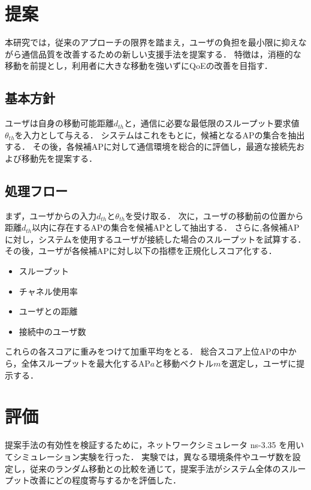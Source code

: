 \documentclass[dvipdfmx,twocolumn]{jsarticle}
\newcommand{\Note}[1]{\noindent \textbf{\textcolor{blue}{#1}}}
\begin{document}
\section{提案}
本研究では，従来のアプローチの限界を踏まえ，ユーザの負担を最小限に抑えながら通信品質を改善するための新しい支援手法を提案する．
特徴は，消極的な移動を前提とし，利用者に大きな移動を強いずにQoEの改善を目指す．
\subsection{基本方針}
ユーザは自身の移動可能距離$d_{th}$と，通信に必要な最低限のスループット要求値$\theta_{th}$を入力として与える．
システムはこれをもとに，候補となるAPの集合を抽出する．
その後，各候補APに対して通信環境を総合的に評価し，最適な接続先および移動先を提案する．
\subsection{処理フロー}
まず，ユーザからの入力$d_{th}$と$\theta_{th}$を受け取る．
次に，ユーザの移動前の位置から距離$d_{th}$以内に存在するAPの集合を候補APとして抽出する．
さらに,各候補APに対し，システムを使用するユーザが接続した場合のスループットを試算する．
その後，ユーザが各候補APに対し以下の指標を正規化しスコア化する．
\begin{itemize}[noitemsep, topsep=0pt]
  \item スループット
  \item チャネル使用率
  \item ユーザとの距離
  \item 接続中のユーザ数
\end{itemize}
これらの各スコアに重みをつけて加重平均をとる．
総合スコア上位APの中から，全体スループットを最大化するAP$a$と移動ベクトル$m$を選定し，ユーザに提示する．


\section{評価}
提案手法の有効性を検証するために，ネットワークシミュレータ ns-3.35 を用いてシミュレーション実験を行った．
実験では，異なる環境条件やユーザ数を設定し，従来のランダム移動との比較を通じて，提案手法がシステム全体のスループット改善にどの程度寄与するかを評価した．
\end{document}
